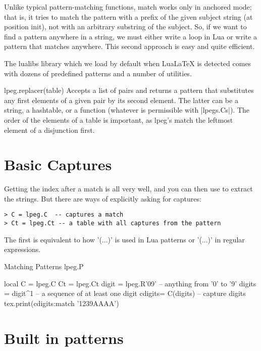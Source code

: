 Unlike typical pattern-matching functions, match works only in anchored mode; that is, it tries to match the pattern with a prefix of the given subject string (at position init), not with an arbitrary substring of the subject. So, if we want to find a pattern anywhere in a string, we must either write a loop in Lua or write a pattern that matches anywhere. This second approach is easy and quite efficient.

The lualibs library which we load by default when LuaLaTeX is detected comes with dozens of predefined patterns and a number of utilities.


lpeg.replacer(table) Accepts a list of pairs and returns a pattern that substitutes any first elements of a given pair by its second element. The latter can be a string, a hashtable, or a function (whatever is permissible with |lpegs.Cs|).
The order of the elements of a table is important, as lpeg's match the leftmost element of a disjunction first.



\section{Basic Captures}

Getting the index after a match is all very well, and you can then use  to extract the strings. But there are ways of explicitly asking for captures:

\begin{verbatim}
> C = lpeg.C  -- captures a match
> Ct = lpeg.Ct -- a table with all captures from the pattern
\end{verbatim}

The first is equivalent to how '(...)' is used in Lua patterns or '(...)' in regular expressions.

\begin{texexample}{Matching Patterns lpeg.P}{}
\begin{luacode}
 local C = lpeg.C
 Ct = lpeg.Ct
 digit = lpeg.R'09'  --  anything from '0' to '9'
 digits = digit^1    --  a sequence of at least one digit
 cdigits= C(digits)  --  capture digits
 tex.print(cdigits:match '1239AAAA')
\end{luacode}
\end{texexample}


\section{Built in patterns}

